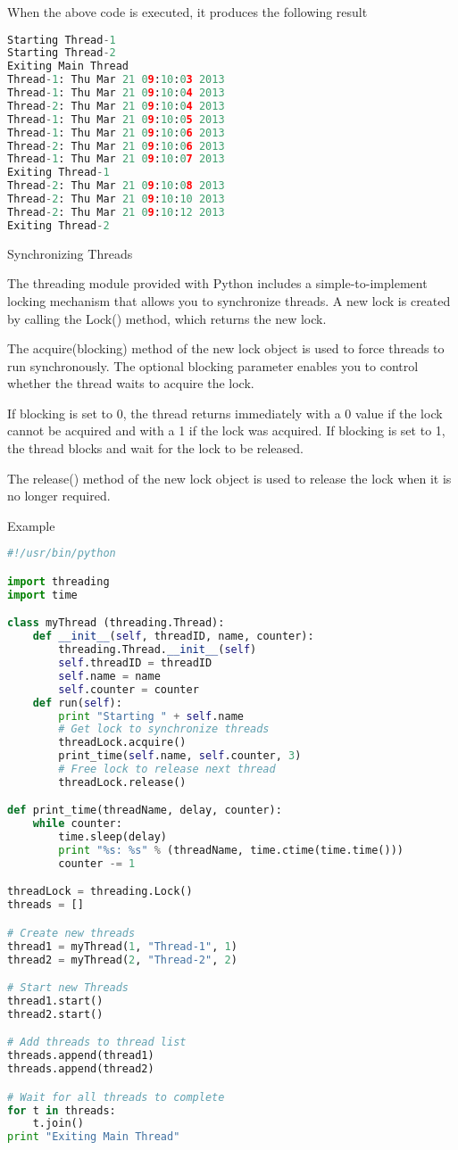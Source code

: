 When the above code is executed, it produces the following result

\begin{lstlisting}[language=Python]
Starting Thread-1
Starting Thread-2
Exiting Main Thread
Thread-1: Thu Mar 21 09:10:03 2013
Thread-1: Thu Mar 21 09:10:04 2013
Thread-2: Thu Mar 21 09:10:04 2013
Thread-1: Thu Mar 21 09:10:05 2013
Thread-1: Thu Mar 21 09:10:06 2013
Thread-2: Thu Mar 21 09:10:06 2013
Thread-1: Thu Mar 21 09:10:07 2013
Exiting Thread-1
Thread-2: Thu Mar 21 09:10:08 2013
Thread-2: Thu Mar 21 09:10:10 2013
Thread-2: Thu Mar 21 09:10:12 2013
Exiting Thread-2
\end{lstlisting}

Synchronizing Threads

The threading module provided with Python includes a simple-to-implement locking mechanism that allows you to synchronize threads. A new lock is created by calling the Lock() method, which returns the new lock.

The acquire(blocking) method of the new lock object is used to force threads to run synchronously. The optional blocking parameter enables you to control whether the thread waits to acquire the lock.

If blocking is set to 0, the thread returns immediately with a 0 value if the lock cannot be acquired and with a 1 if the lock was acquired. If blocking is set to 1, the thread blocks and wait for the lock to be released.

The release() method of the new lock object is used to release the lock when it is no longer required.

Example

\begin{lstlisting}[language=Python]
#!/usr/bin/python

import threading
import time

class myThread (threading.Thread):
    def __init__(self, threadID, name, counter):
        threading.Thread.__init__(self)
        self.threadID = threadID
        self.name = name
        self.counter = counter
    def run(self):
        print "Starting " + self.name
        # Get lock to synchronize threads
        threadLock.acquire()
        print_time(self.name, self.counter, 3)
        # Free lock to release next thread
        threadLock.release()

def print_time(threadName, delay, counter):
    while counter:
        time.sleep(delay)
        print "%s: %s" % (threadName, time.ctime(time.time()))
        counter -= 1

threadLock = threading.Lock()
threads = []

# Create new threads
thread1 = myThread(1, "Thread-1", 1)
thread2 = myThread(2, "Thread-2", 2)

# Start new Threads
thread1.start()
thread2.start()

# Add threads to thread list
threads.append(thread1)
threads.append(thread2)

# Wait for all threads to complete
for t in threads:
    t.join()
print "Exiting Main Thread"
\end{lstlisting}

